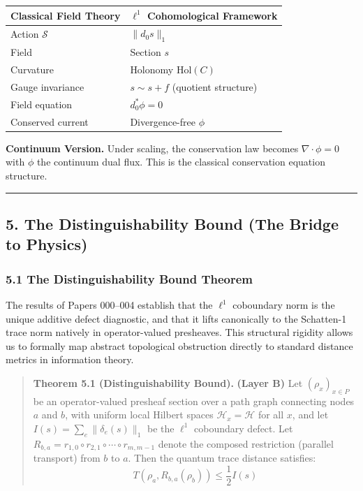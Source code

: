 \documentclass[
]{article}
\begin{document}
\begin{longtable}[]{@{}ll@{}}
\toprule\noalign{}
Classical Field Theory & \(\ell^1\) Cohomological Framework \\
\midrule\noalign{}
\endhead
\bottomrule\noalign{}
\endlastfoot
Action \(\mathcal{S}\) & \(\|d_0 s\|_1\) \\
Field & Section \(s\) \\
Curvature & Holonomy \(\mathrm{Hol}(C)\) \\
Gauge invariance & \(s \sim s + f\) (quotient structure) \\
Field equation & \(d_0^* \phi = 0\) \\
Conserved current & Divergence-free \(\phi\) \\
\end{longtable}

\textbf{Continuum Version.} Under scaling, the conservation law becomes
\(\nabla \cdot \phi = 0\) with \(\phi\) the continuum dual flux. This is
the classical conservation equation structure.

\begin{center}\rule{0.5\linewidth}{0.5pt}\end{center}

\subsection{5. The Distinguishability Bound (The Bridge to
Physics)}\label{the-distinguishability-bound-the-bridge-to-physics}

\subsubsection{5.1 The Distinguishability Bound
Theorem}\label{the-distinguishability-bound-theorem}

The results of Papers 000--004 establish that the \(\ell^1\) coboundary
norm is the unique additive defect diagnostic, and that it lifts
canonically to the Schatten-1 trace norm natively in operator-valued
presheaves. This structural rigidity allows us to formally map abstract
topological obstruction directly to standard distance metrics in
information theory.

\begin{quote}
\textbf{Theorem 5.1 (Distinguishability Bound).} \textbf{(Layer B)} Let
\((\rho_x)_{x \in P}\) be an operator-valued presheaf section over a
path graph connecting nodes \(a\) and \(b\), with uniform local Hilbert
spaces \(\mathcal{H}_x = \mathcal{H}\) for all \(x\), and let
\(I(s) = \sum_e \|\delta_e(s)\|_1\) be the \(\ell^1\) coboundary defect.
Let \(R_{b,a} = r_{1,0} \circ r_{2,1} \circ \cdots \circ r_{m,m-1}\)
denote the composed restriction (parallel transport) from \(b\) to
\(a\). Then the quantum trace distance satisfies:
\[ T(\rho_a, R_{b,a}(\rho_b)) \le \frac{1}{2} I(s) \]
\end{quote}
\end{document}
